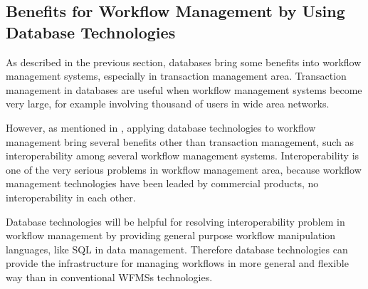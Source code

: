 \subsection{Benefits for Workflow Management by Using Database Technologies}

As described in the previous section, databases bring some benefits
into workflow management systems, especially in transaction management
area.  Transaction management in databases are useful when workflow
management systems become very large, for example involving thousand of
users in wide area networks.

However, as mentioned in \cite{alonso:nsf96}, applying database
technologies to workflow management bring several benefits other than
transaction management, such as interoperability among several workflow
management systems.
Interoperability is one of the very serious problems in workflow
management area, because workflow management technologies have been
leaded by commercial products, no interoperability in each other.

Database technologies will be helpful for resolving interoperability
problem in workflow management by providing general purpose workflow
manipulation languages, like SQL in data management.  Therefore database 
technologies can provide the infrastructure for managing workflows in
more general and flexible way than in conventional WFMSs technologies.


